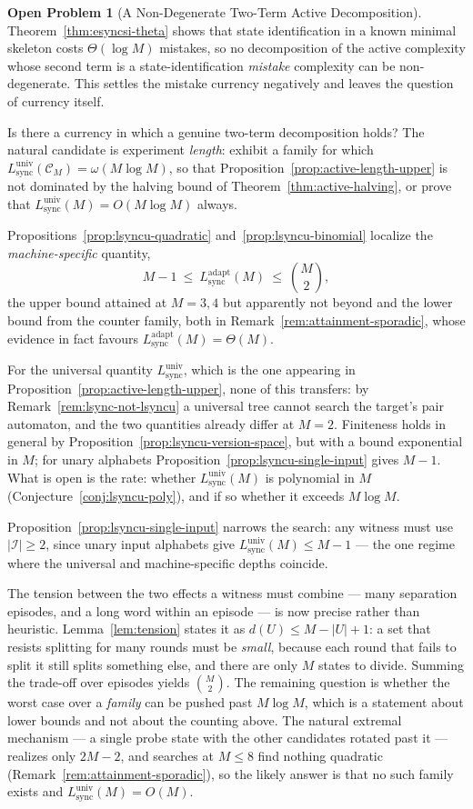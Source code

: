 \documentclass[12pt]{article}
\theoremstyle{definition}
\newtheorem{openproblem}[theorem]{Open Problem}
\newcommand{\Lsync}{L_{\mathrm{sync}}^{\mathrm{adapt}}}
\newcommand{\Lsyncu}{L_{\mathrm{sync}}^{\mathrm{univ}}}
\begin{document}
\begin{openproblem}[A Non-Degenerate Two-Term Active Decomposition]
\label{open:si-hard-family}
Theorem~\ref{thm:esyncsi-theta} shows that state identification in a known
minimal skeleton costs $\Theta(\log M)$ mistakes, so no
decomposition of the active complexity whose second term is a
state-identification \emph{mistake} complexity can be non-degenerate.  This
settles the mistake currency negatively and leaves the question of currency
itself.

Is there a currency in which a genuine two-term decomposition holds?
The natural candidate is experiment \emph{length}: exhibit a family for which
$\Lsyncu(\mathcal C_M)=\omega(M\log M)$, so that
Proposition~\ref{prop:active-length-upper} is not dominated by the halving
bound of Theorem~\ref{thm:active-halving}, or prove that
$\Lsyncu(M)=O(M\log M)$ always.

Propositions~\ref{prop:lsyncu-quadratic} and~\ref{prop:lsyncu-binomial}
localize the \emph{machine-specific} quantity,
\[
M-1\ \le\ \Lsync(M)\ \le\ \binom{M}{2},
\]
the upper bound attained at $M=3,4$ but apparently not beyond and the lower
bound from the counter family, both in
Remark~\ref{rem:attainment-sporadic}, whose evidence in fact favours
$\Lsync(M)=\Theta(M)$.

For the universal quantity $\Lsyncu$, which is the one appearing in
Proposition~\ref{prop:active-length-upper}, none of this transfers: by
Remark~\ref{rem:lsync-not-lsyncu} a universal tree cannot search the target's
pair automaton, and the two quantities already differ at $M=2$.  Finiteness holds in general by
Proposition~\ref{prop:lsyncu-version-space}, but with a bound exponential in
$M$; for unary alphabets Proposition~\ref{prop:lsyncu-single-input} gives
$M-1$.  What is open is the rate: whether $\Lsyncu(M)$ is polynomial in $M$
(Conjecture~\ref{conj:lsyncu-poly}), and if so whether it exceeds
$M\log M$.

Proposition~\ref{prop:lsyncu-single-input} narrows the search: any witness
must use $|\mathcal I|\ge2$, since unary input alphabets give
$\Lsyncu(M)\le M-1$ --- the one regime where the universal and machine-specific
depths coincide.

The tension between the two effects a witness must combine --- many separation
episodes, and a long word within an episode --- is now precise rather than
heuristic.  Lemma~\ref{lem:tension} states it as
$d(U)\le M-|U|+1$: a set that resists splitting for many rounds must be
\emph{small}, because each round that fails to split it still splits something
else, and there are only $M$ states to divide.  Summing the trade-off over
episodes yields $\binom{M}{2}$.  The remaining question is whether the worst
case over a \emph{family} can be pushed past $M\log M$, which is a statement
about lower bounds and not about the counting above.  The natural extremal
mechanism --- a single probe state with the other candidates rotated past it
--- realizes only $2M-2$, and searches at $M\le8$ find nothing quadratic
(Remark~\ref{rem:attainment-sporadic}), so the likely answer is that no such
family exists and $\Lsyncu(M)=O(M)$.
\end{openproblem}
\end{document}
